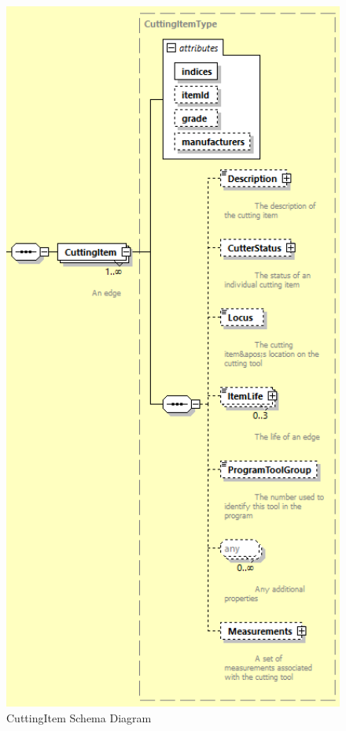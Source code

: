 \begin{figure}[ht]
  \centering
    \includegraphics[width=1.0\textwidth]{figures/CuttingItem Schema.png}
  \caption{CuttingItem Schema Diagram}
  \label{fig:CuttingItem Schema Diagram}
\end{figure}

